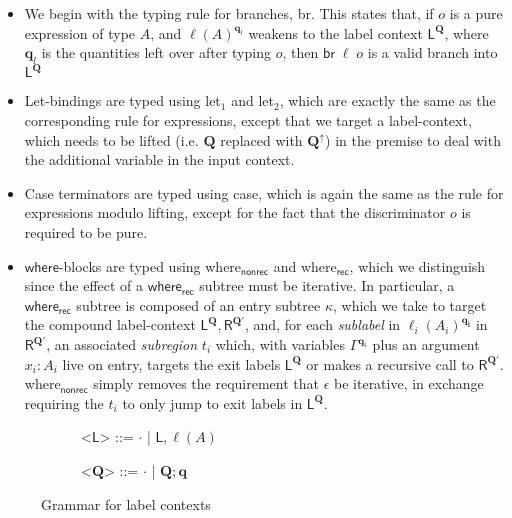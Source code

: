 \documentclass[acmsmall,screen,review]{acmart}
\newcommand{\mb}[1]{\ensuremath{\mathbf{#1}}}
\newcommand{\ms}[1]{\ensuremath{\mathsf{#1}}}
\newcommand{\brb}[2]{\ms{br}\;#1\;#2}
\newcommand{\lhyp}[2]{#1(#2)}
\newcommand{\brle}[1]{{\textsf{#1}}}
\newcommand{\zeroqv}[1]{#1^\uparrow}
\begin{document}
\begin{itemize}
  \item We begin with the typing rule for branches, \brle{br}. This states that, if $o$ is a pure
  expression of type $A$, and $\ell(A)^{\mb{q}_l}$ weakens to the label context 
  $\ms{L}^{\mb{Q}}$, where $\mb{q}_l$ is the quantities left over after typing $o$, then
  $\brb{\ell}{o}$ is a valid branch into $\ms{L}^{\mb{Q}}$
  \item Let-bindings are typed using \brle{let$_1$} and \brle{let$_2$}, which are exactly the same
  as the corresponding rule for expressions, except that we target a label-context, which needs to
  be lifted (i.e. $\mb{Q}$ replaced with $\zeroqv{\mb{Q}}$) in the premise to deal with the 
  additional variable in the input context.
  \item Case terminators are typed using \brle{case}, which is again the same as the rule for 
  expressions modulo lifting, except for the fact that the discriminator $o$ is required to be
  pure.
  \item \ms{where}-blocks are typed using \brle{where$_\ms{nonrec}$} and \brle{where$_\ms{rec}$},
  which we distinguish since the effect of a \ms{where_{rec}} subtree must be iterative. In
  particular, a  \ms{where_{rec}} subtree is composed of an entry subtree $\kappa$, which we take to
  target the compound label-context $\ms{L}^{\mb{Q}}, \ms{R}^{\mb{Q}'}$, and, for each
  \emph{sublabel} in $\ell_i(A_i)^{\mb{q_i}}$ in $\ms{R}^{\mb{Q}'}$, an associated \emph{subregion}
  $t_i$ which, with variables $\Gamma^{\mb{q}_i}$ plus an argument $x_i : A_i$ live on entry,
  targets the exit labels $\ms{L}^{\mb{Q}}$ or makes a recursive call to $\ms{R}^{\mb{Q}'}$.
  \brle{where$_\ms{nonrec}$} simply removes the requirement that $\epsilon$ be iterative, in
  exchange requiring the $t_i$ to only jump to exit labels in $\ms{L}^{\mb{Q}}$.
\end{itemize}

\begin{figure}
  \hspace{4em}
  \begin{subfigure}[t]{.25\textwidth}
  \begin{grammar}
    <\(\ms{L}\)> ::= \(\cdot\) \;|\; \(\ms{L}, \lhyp{\ell}{A}\)
  \end{grammar}
  \end{subfigure}%
  \begin{subfigure}[t]{.25\textwidth}
  \begin{grammar}
    <\(\mb{Q}\)> ::= \(\cdot\) \;|\; \(\mb{Q}; \mb{q}\)
  \end{grammar}
  \end{subfigure}%
  \caption{Grammar for label contexts}
  \Description{}
  \label{fig:label-grammar}
\end{figure}
\end{document}
